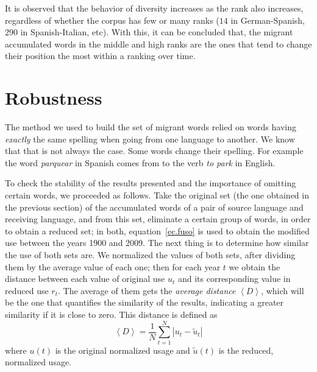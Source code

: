 \documentclass[10pt,letterpaper]{article} %
\begin{document}
It is observed that the behavior of
diversity increases as the rank also increases, regardless of whether the
corpus has few or many ranks ($14$ in German-Spanish, $290$ in Spanish-Italian,
etc). With this, it can be concluded that, the migrant accumulated words in the
middle and high ranks are the ones that tend to change their position the most
within a ranking over time.



\section*{Robustness} %
The method we used to build the set of migrant words relied on words having {\it
exactly} the same spelling when going from one language to another. We know 
that that is not always the case. Some words change their spelling. For example
the word {\it parquear} in Spanish comes from to the verb {\it to park} in
English. 


To check the stability of the results presented and the importance of omitting
certain words, we proceeded as follows.  Take the original set (the one
obtained in the previous section) of the accumulated words of a pair of source
language and receiving language, and from this set, eliminate a certain group
of words, in order to obtain a reduced set; in both,  equation~\ref{ec.fuso} is
used to obtain the modified use between the years 1900 and 2009.  The next
thing is to determine how similar the use of both sets are. We normalized the
values of both sets, after dividing them by the average value of each one; then
for each year $t$ we obtain the distance between each value of original use
$u_{t}$ and its corresponding value in reduced use $r_{t}$. The average of them
gets the \textit{average distance} $\left\langle D \right\rangle$, which will
be the one that quantifies the similarity of the results, indicating a greater
similarity if it is close to zero. This distance is defined as 
\begin{equation}
\left\langle D \right\rangle  = \frac{1}{N}\sum_{t=1}^{N} \left| u_{t} - \tilde u_{t} \right|  
\label{ec.Davg}
\end{equation}
where $u(t)$ is the original normalized usage and $\tilde u(t)$ is the reduced,
normalized usage.
\end{document}

